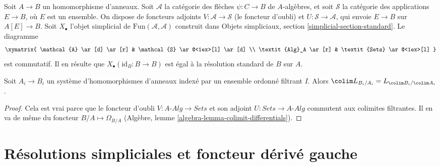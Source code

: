\begin{remark}
\label{remark-variant-cotangent-complex}
Soit $A \to B$ un homomorphisme d'anneaux. Soit $\mathcal{A}$ la catégorie
des flèches $\psi : C \to B$ de $A$-algèbres, et soit $\mathcal{S}$ la
catégorie des applications $E \to B$, où $E$ est un ensemble. On dispose de
foncteurs adjoints $V : \mathcal{A} \to \mathcal{S}$ (le foncteur d'oubli) et
$U : \mathcal{S} \to \mathcal{A}$, qui envoie $E \to B$ sur
$A[E] \to B$. Soit $X_\bullet$ l'objet simplicial de
$\text{Fun}(\mathcal{A}, \mathcal{A})$ construit dans Objets simpliciaux,
section \ref{simplicial-section-standard}. Le diagramme
$$
\xymatrix{
\mathcal{A} \ar[d] \ar[r] & \mathcal{S} \ar@<1ex>[l] \ar[d] \\
\textit{Alg}_A \ar[r] & \textit{Sets} \ar@<1ex>[l]
}
$$
est commutatif. Il en résulte que $X_\bullet(\text{id}_B : B \to B)$ est égal
à la résolution standard de $B$ sur $A$.
\end{remark}

\begin{lemma}
\label{lemma-colimit-cotangent-complex}
Soit $A_i \to B_i$ un système d'homomorphismes d'anneaux indexé par un
ensemble ordonné filtrant $I$. Alors
$\colim L_{B_i/A_i} = L_{\colim B_i/\colim A_i}$.
\end{lemma}

\begin{proof}
Cela est vrai parce que le foncteur d'oubli
$V : A\textit{-Alg} \to \textit{Sets}$ et son adjoint
$U : \textit{Sets} \to A\textit{-Alg}$ commutent aux colimites filtrantes.
Il en va de même du foncteur $B/A \mapsto \Omega_{B/A}$
(Algèbre, lemme \ref{algebra-lemma-colimit-differentials}).
\end{proof}





\section{Résolutions simpliciales et foncteur dérivé gauche}
\label{section-compute-L-pi-shriek}

